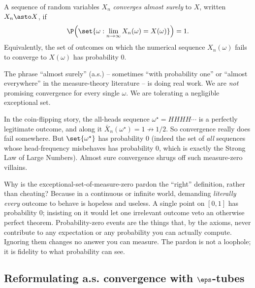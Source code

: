 \begin{definition}
\label{ch22:def-as}
A sequence of random variables $X_n$ \emph{converges almost surely} to $X$, written
$X_n \asto X$, if
\[
  \P\!\left(\set{\omega : \lim_{n\to\infty} X_n(\omega) = X(\omega)}\right) = 1.
\]
Equivalently, the set of outcomes on which the numerical sequence $X_n(\omega)$ fails
to converge to $X(\omega)$ has probability $0$.
\end{definition}

The phrase ``almost surely'' (a.s.) -- sometimes ``with probability one'' or
``almost everywhere'' in the measure-theory literature -- is doing real work. We are
\emph{not} promising convergence for every single $\omega$. We are tolerating a
negligible exceptional set.

\begin{example}
\label{ch22:ex-bad-set}
In the coin-flipping story, the all-heads sequence $\omega^\star = HHHH\cdots$ is a
perfectly legitimate outcome, and along it $\bar X_n(\omega^\star) = 1 \not\to 1/2$.
So convergence really does fail somewhere. But $\set{\omega^\star}$ has probability
$0$ (indeed the set of \emph{all} sequences whose head-frequency misbehaves has
probability $0$, which is exactly the Strong Law of Large Numbers). Almost sure
convergence shrugs off such measure-zero villains.
\end{example}

\begin{whybox}
Why is the exceptional-set-of-measure-zero pardon the ``right'' definition, rather
than cheating? Because in a continuous or infinite world, demanding \emph{literally
every} outcome to behave is hopeless and useless. A single point on $[0,1]$ has
probability $0$; insisting on it would let one irrelevant outcome veto an otherwise
perfect theorem. Probability-zero events are the things that, by the axioms, never
contribute to any expectation or any probability you can actually compute. Ignoring
them changes no answer you can measure. The pardon is not a loophole; it is fidelity
to what probability can see.
\end{whybox}

\subsection{Reformulating a.s. convergence with $\eps$-tubes}
\label{ch22:as-tube}

